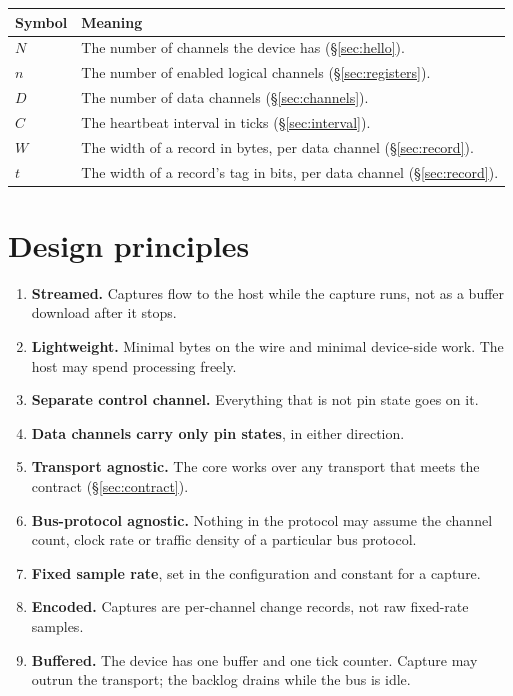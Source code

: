 \documentclass[11pt,a4paper]{article}
\newcommand{\sref}[1]{\S\ref{#1}}
\begin{document}
\begin{tabularx}{\linewidth}{@{}l L@{}}
\toprule
\textbf{Symbol} & \textbf{Meaning} \\
\midrule
$N$ & The number of channels the device has (\sref{sec:hello}). \\
$n$ & The number of enabled logical channels (\sref{sec:registers}). \\
$D$ & The number of data channels (\sref{sec:channels}). \\
$C$ & The heartbeat interval in ticks (\sref{sec:interval}). \\
$W$ & The width of a record in bytes, per data channel (\sref{sec:record}). \\
$t$ & The width of a record's tag in bits, per data channel (\sref{sec:record}). \\
\bottomrule
\end{tabularx}

\section{Design principles}\label{sec:principles}

\begin{enumerate}
  \item \textbf{Streamed.} Captures flow to the host while the capture runs, not as a
        buffer download after it stops.
  \item \textbf{Lightweight.} Minimal bytes on the wire and minimal device-side work.
        The host may spend processing freely.
  \item \textbf{Separate control channel.} Everything that is not pin state goes on it.
  \item \textbf{Data channels carry only pin states}, in either direction.
  \item \textbf{Transport agnostic.} The core works over any transport that meets the
        contract (\sref{sec:contract}).
  \item \textbf{Bus-protocol agnostic.} Nothing in the protocol may assume the channel
        count, clock rate or traffic density of a particular bus protocol.
  \item \textbf{Fixed sample rate}, set in the configuration and constant for a
        capture.
  \item \textbf{Encoded.} Captures are per-channel change records, not raw fixed-rate
        samples.
  \item \textbf{Buffered.} The device has one buffer and one tick counter. Capture may
        outrun the transport; the backlog drains while the bus is idle.
\end{enumerate}
\end{document}
